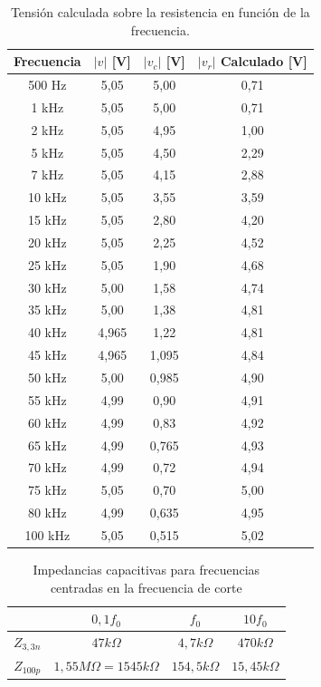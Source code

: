 \documentclass{article}
\begin{document}
  
  \begin{table}[H]
         \centering
        \renewcommand{\arraystretch}{1.1}
        \begin{tabular}{cccc}
        \toprule
        \textbf{Frecuencia} & \textbf{$|v|$ [V]} & \textbf{$|v_c|$ [V]} & \textbf{$|v_r|$ Calculado [V]} \\
        \midrule
        500 Hz & 5,05 & 5,00 & 0,71 \\
        1 kHz  & 5,05 & 5,00 & 0,71 \\
        2 kHz  & 5,05 & 4,95 & 1,00 \\
        5 kHz  & 5,05 & 4,50 & 2,29 \\
        7 kHz  & 5,05 & 4,15 & 2,88 \\
        10 kHz & 5,05 & 3,55 & 3,59 \\
        15 kHz & 5,05 & 2,80 & 4,20 \\
        20 kHz & 5,05 & 2,25 & 4,52 \\
        25 kHz & 5,05 & 1,90 & 4,68 \\
        30 kHz & 5,00 & 1,58 & 4,74 \\
        35 kHz & 5,00 & 1,38 & 4,81 \\
        40 kHz & 4,965 & 1,22 & 4,81 \\
        45 kHz & 4,965 & 1,095 & 4,84 \\
        50 kHz & 5,00 & 0,985 & 4,90 \\
        55 kHz & 4,99 & 0,90 & 4,91 \\
        60 kHz & 4,99 & 0,83 & 4,92 \\
        65 kHz & 4,99 & 0,765 & 4,93 \\
        70 kHz & 4,99 & 0,72 & 4,94 \\
        75 kHz & 5,05 & 0,70 & 5,00 \\
        80 kHz & 4,99 & 0,635 & 4,95 \\
        100 kHz & 5,05 & 0,515 & 5,02 \\
        \bottomrule
        \end{tabular}
        \caption{Tensión calculada sobre la resistencia en función de la frecuencia.}
        \label{tab:vr_calculada}
                    \end{table}

            \begin{table}[H]
                \centering
                \begin{tabular}{|c|c|c|c|}
                    \hline     & $0,1f_0$    & $f_0$           & $10f_0$       \\ \hline
                    $Z_{3,3n}$ & $47 k\Omega$ & $4,7 k\Omega$ & $470 k\Omega$ \\ \hline
                    $Z_{100p}$ & $1,55 M\Omega = 1545 k\Omega$ & $154,5 k\Omega$ & $15,45 k\Omega$ \\ \hline
                \end{tabular}
                \caption{Impedancias capacitivas para frecuencias centradas en la frecuencia de corte}
                \label{table:impedanciasCapacivas}
            \end{table}
\end{document}
